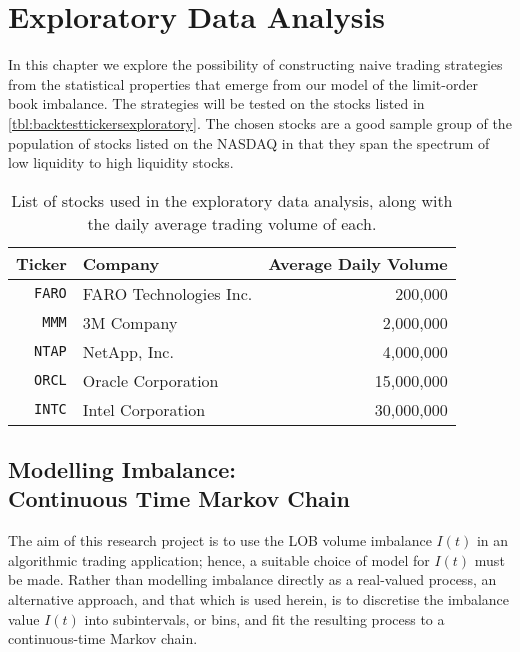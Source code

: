 \chapter{Exploratory Data Analysis}

In this chapter we explore the possibility of constructing naive trading strategies from the statistical properties that emerge from our model of the limit-order book imbalance. The strategies will be tested on the stocks listed in \autoref{tbl:backtesttickersexploratory}. The chosen stocks are a good sample group of the population of stocks listed on the NASDAQ in that they span the spectrum of low liquidity to high liquidity stocks.

\begin{table}[H]%
\centering%
%
\caption[Stocks used in the exploratory data analysis]{List of stocks used in the exploratory data analysis, along with the daily average trading volume of each.}\label{tbl:backtesttickersexploratory}%
\begin{tabular}{@{} rlr @{}}%
\toprule
Ticker & Company & Average Daily Volume \\
\midrule
\texttt{FARO} & FARO Technologies Inc. & 200,000 \\
\texttt{MMM} & 3M Company & 2,000,000 \\
\texttt{NTAP} & NetApp, Inc. & 4,000,000 \\
\texttt{ORCL} & Oracle Corporation & 15,000,000 \\
\texttt{INTC} & Intel Corporation & 30,000,000 \\
\bottomrule
\end{tabular}%
\end{table}%

\section[Modelling Imbalance: Continuous Time Markov Chain]{Modelling Imbalance: \texorpdfstring{\\}{} Continuous Time Markov Chain}
The aim of this research project is to use the LOB volume imbalance $I(t)$ in an algorithmic trading application; hence, a suitable choice of model for $I(t)$ must be made. Rather than modelling imbalance directly as a real-valued process, an alternative approach, and that which is used herein, is to discretise the imbalance value $I(t)$ into subintervals, or bins, and fit the resulting process to a continuous-time Markov chain.

